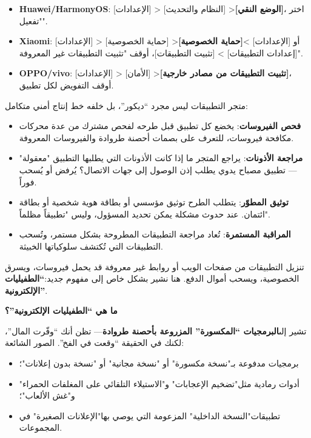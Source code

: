 
\begin{itemize}
  \item \textbf{Huawei/HarmonyOS}: [الإعدادات] > [النظام والتحديث] >\textbf{[الوضع النقي]}، اختر "تفعيل".
  \item \textbf{Xiaomi}: [الإعدادات] > [حماية الخصوصية] >\textbf{[حماية الخصوصية]}أو [الإعدادات] > [إعدادات التطبيقات] > [تثبيت التطبيقات]، أوقف "تثبيت التطبيقات غير المعروفة".
  \item \textbf{OPPO/vivo}: [الإعدادات] > [الأمان] >\textbf{[تثبيت التطبيقات من مصادر خارجية]}، أوقف التفويض لكل تطبيق.
\end{itemize}


متجر التطبيقات ليس مجرد “ديكور”، بل خلفه خط إنتاج أمني متكامل:

\begin{itemize}
  \item \textbf{فحص الفيروسات}: يخضع كل تطبيق قبل طرحه لفحص مشترك من عدة محركات مكافحة فيروسات، للتعرف على بصمات أحصنة طروادة والفيروسات المعروفة.
  \item \textbf{مراجعة الأذونات}: يراجع المتجر ما إذا كانت الأذونات التي يطلبها التطبيق "معقولة" — تطبيق مصباح يدوي يطلب إذن الوصول إلى جهات الاتصال؟ يُرفض أو يُسحب فوراً.
  \item \textbf{توثيق المطوّر}: يتطلب الطرح توثيق مؤسسي أو بطاقة هوية شخصية أو بطاقة ائتمان. عند حدوث مشكلة يمكن تحديد المسؤول، وليس "تطبيقاً مظلماً".
  \item \textbf{المراقبة المستمرة}: تُعاد مراجعة التطبيقات المطروحة بشكل مستمر، وتُسحب التطبيقات التي تُكتشف سلوكياتها الخبيثة.
\end{itemize}


تنزيل التطبيقات من صفحات الويب أو روابط غير معروفة قد يحمل فيروسات، ويسرق الخصوصية، ويسحب أموال الدفع. هنا نشير بشكل خاص إلى مفهوم جديد:\textbf{“الطفيليات الإلكترونية”}.

\textbf{ما هي “الطفيليات الإلكترونية”؟}\par

تشير إلى\textbf{البرمجيات “المكسورة” المزروعة بأحصنة طروادة}— تظن أنك “وفّرت المال”، لكنك في الحقيقة “وقعت في الفخ”. الصور الشائعة:

\begin{itemize}
  \item برمجيات مدفوعة بـ"نسخة مكسورة" أو "نسخة مجانية" أو "نسخة بدون إعلانات"؛
  \item أدوات رمادية مثل"تضخيم الإعجابات" و"الاستيلاء التلقائي على المغلفات الحمراء" و"غش الألعاب"؛
  \item تطبيقات"النسخة الداخلية" المزعومة التي يوصي بها"الإعلانات الصغيرة" في المجموعات.
\end{itemize}

